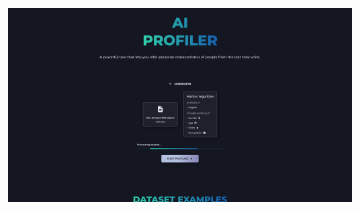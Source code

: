 \bigskip
\begin{figure}[H]
	\centering
	\begin{subfigure}[c]{0.74\textwidth}
			\centering
			\includegraphics[width=\textwidth]{imagenes/overview.png}
			\label{fig:casouso_overview_escritorio}
	\end{subfigure}
	\hfill
	\begin{subfigure}[c]{0.21\textwidth}
			\centering

\end{subfigure}
\end{figure}
